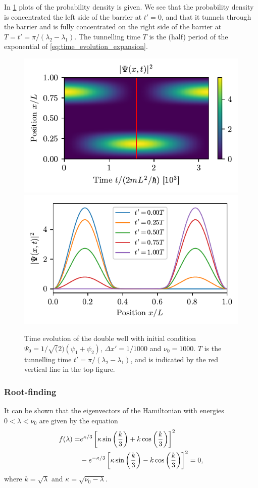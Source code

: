 In \cref{fig:double_well_solutions} plots of the probability density is given. We see that the probability density is concentrated the left side of the barrier at $t'=0$, and that it tunnels through the barrier and is fully concentrated on the right side of the barrier at $T = t' = \pi/(\lambda_2 - \lambda_1)$. The tunnelling time $T$ is the (half) period of the exponential of \cref{eq:time_evolution_expansion}.
\begin{figure}[ht!]%
\centering%
\includegraphics{figs/double_twopsi_prob.pdf}\\%
\includegraphics{figs/double_twopsi_prob_1d.pdf}%
\caption{Time evolution of the double well with initial condition $\Psi_0 = 1/\sqrt(2)(\psi_1 + \psi_2)$, $\Delta x' = 1/1000$ and $\nu_0 = 1000$. $T$ is the tunnelling time $t' = \pi/(\lambda_2 - \lambda_1)$, and is indicated by the red vertical line in the top figure. \label{fig:double_well_solutions}}%
\end{figure}

\subsubsection*{Root-finding}
It can be shown that the eigenvectors of the Hamiltonian with energies $0 < \lambda < \nu_0$ are given by the equation
\begin{align}
    f(\lambda) = 
    &e^{\kappa/3}\sbr{\kappa\sin\del{\frac{k}{3}} + k\cos\del{\frac{k}{3}}}^2 \nonumber\\
    & - e^{-\kappa/3}\sbr{\kappa\sin\del{\frac{k}{3}} - k\cos\del{\frac{k}{3}}}^2 = 0,
    \label{eq:roots}
\end{align}
where $k = \sqrt{\lambda}$ and $\kappa = \sqrt{\nu_0 - \lambda}$.

